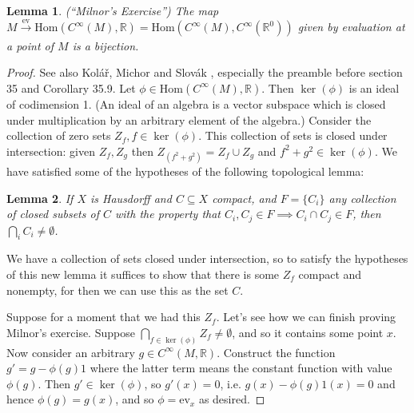 \documentclass[12pt]{article}
\newcommand{\Hom}{\mathrm{Hom}}
\newcommand{\rr}{\ensuremath{\mathbb{R}}}
\newcommand{\cinfty}{\ensuremath{C^{\infty}}}
\newtheorem{mylemma}{Lemma}
\begin{document}
\begin{mylemma}\label{lemma:smoothfact1}(``Milnor's Exercise'') The map $M\xrightarrow[]{\mathrm{ev}}\Hom(\cinfty(M),\rr)=\Hom(\cinfty(M),\cinfty(\rr^0))$ given by evaluation at a point of $M$ is a bijection.
\end{mylemma}
\begin{proof}
See also Kolář, Michor and Slovák \cite{kolar_natural_1993}, especially the preamble before section 35 and Corollary 35.9. Let $\phi\in\Hom(\cinfty(M), \rr)$. Then $\ker(\phi)$ is an ideal of codimension 1. (An ideal of an algebra is a vector subspace which is closed under multiplication by an arbitrary element of the algebra.) Consider the collection of zero sets $Z_f, f\in \ker(\phi)$. This collection of sets is closed under intersection: given $Z_f, Z_g$ then $Z_{(f^2+g^2)} = Z_f\cup Z_g$ and $f^2+g^2\in\ker(\phi)$. We have satisfied some of the hypotheses of the following topological lemma:

\begin{mylemma}If $X$ is Hausdorff and $C\subseteq X$ compact, and $F=\{C_i\}$ any collection of closed subsets of $C$ with the property that $C_i, C_j\in F\implies C_i\cap C_j\in F$, then $\bigcap_i C_i \neq\emptyset$.\end{mylemma}

We have a collection of sets closed under intersection, so to satisfy the hypotheses of this new lemma it suffices to show that there is some $Z_f$ compact and nonempty, for then we can use this as the set $C$.

Suppose for a moment that we had this $Z_f$. Let's see how we can finish proving Milnor's exercise. Suppose $\bigcap_{f\in\ker(\phi)}Z_f\neq\emptyset$, and so it contains some point $x$. Now consider an arbitrary $g\in\cinfty(M,\rr)$. Construct the function $g'=g-\phi(g)1$ where the latter term means the constant function with value $\phi(g)$. Then $g'\in\ker(\phi)$, so $g'(x)=0$, i.e. $g(x)-\phi(g)1(x)=0$ and hence $\phi(g)=g(x)$, and so $\phi=\mathrm{ev}_x$ as desired.


\end{proof}
\end{document}
